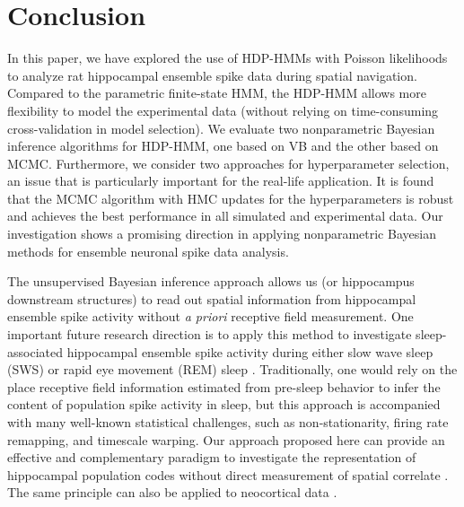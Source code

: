 \section{Conclusion}

In this paper, we have explored the use of HDP-HMMs with Poisson
likelihoods to analyze rat hippocampal ensemble spike data during
spatial navigation. Compared to the parametric finite-state HMM, the
HDP-HMM allows more flexibility to model the experimental data
(without relying on time-consuming cross-validation in model
selection). We evaluate two nonparametric Bayesian inference
algorithms for HDP-HMM, one based on VB and the other based on
MCMC. Furthermore, we consider two approaches for hyperparameter
selection, an issue that is particularly important for the real-life
application.  It is found that the MCMC algorithm with HMC updates for
the hyperparameters is robust and achieves the best performance in all
simulated and experimental data. Our investigation shows a promising
direction in applying nonparametric Bayesian methods for ensemble
neuronal spike data analysis.

The unsupervised Bayesian inference approach allows us (or hippocampus
downstream structures) to read out spatial information from
hippocampal ensemble spike activity without {\em a priori} receptive
field measurement.  One important future research direction is to
apply this method to investigate sleep-associated hippocampal ensemble
spike activity during either slow wave sleep (SWS) or rapid eye
movement (REM) sleep \citep{Louie01,Lee02}. Traditionally, one would
rely on the place receptive field information estimated from pre-sleep
behavior to infer the content of population spike activity in sleep,
but this approach is accompanied with many well-known statistical
challenges, such as non-stationarity, firing rate remapping, and
timescale warping. Our approach proposed here can provide an effective
and complementary paradigm to investigate the representation of
hippocampal population codes without direct measurement of spatial
correlate \citep{Chen15}. The same principle can also be applied to
neocortical data \citep{Ji07,Peyrache09,Gulati14}.


